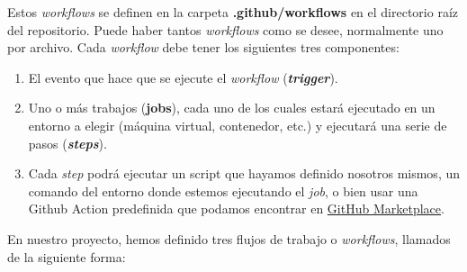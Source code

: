 Estos \textit{workflows} se definen en la carpeta \textbf{.github/workflows} en el directorio
raíz del repositorio. Puede haber tantos \textit{workflows} como se desee, normalmente uno
por archivo. Cada \textit{workflow} debe tener los siguientes tres componentes:

    \begin{enumerate}
        \item El evento que hace que se ejecute el \textit{workflow} (\textbf{\textit{trigger}}).
        \item Uno o más trabajos (\textbf{jobs}), cada uno de los cuales estará ejecutado en
        un entorno a elegir (máquina virtual, contenedor, etc.) y ejecutará una serie de
        pasos (\textbf{\textit{steps}}).
        \item Cada \textit{step} podrá ejecutar un script que hayamos definido nosotros
        mismos, un comando del entorno donde estemos ejecutando el \textit{job}, o bien usar
        una Github Action predefinida que podamos encontrar en
        \href{https://github.com/marketplace?type=actions}{GitHub Marketplace}.
    \end{enumerate}

En nuestro proyecto, hemos definido tres flujos de trabajo o \textit{workflows}, llamados
de la siguiente forma:

